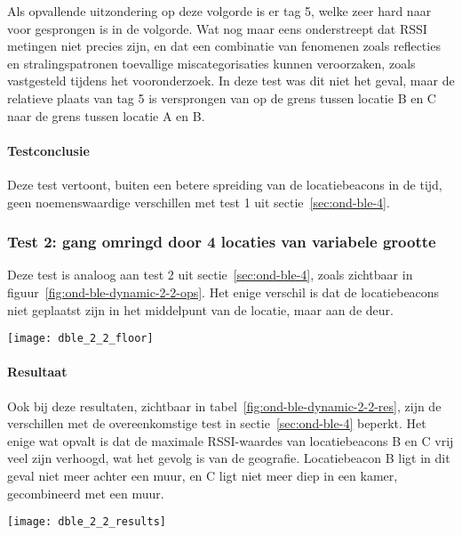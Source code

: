 Als opvallende uitzondering op deze volgorde is er tag 5, welke zeer hard naar voor gesprongen is in de volgorde. Wat nog maar eens onderstreept dat RSSI metingen niet precies zijn, en dat een combinatie van fenomenen zoals reflecties en stralingspatronen toevallige miscategorisaties kunnen veroorzaken, zoals vastgesteld tijdens het vooronderzoek. In deze test was dit niet het geval, maar de relatieve plaats van tag 5 is versprongen van op de grens tussen locatie B en C naar de grens tussen locatie A en B.

\paragraph{Testconclusie}
Deze test vertoont, buiten een betere spreiding van de locatiebeacons in de tijd, geen noemenswaardige verschillen met test 1 uit sectie~\ref{sec:ond-ble-4}.

\subsubsection{Test 2: gang omringd door 4 locaties van variabele grootte}
\label{sec:ond-ble-5-2}
\begin{minipage}{0.55\textwidth}
Deze test is analoog aan test 2 uit sectie~\ref{sec:ond-ble-4}, zoals zichtbaar in figuur~\ref{fig:ond-ble-dynamic-2-2-ops}. Het enige verschil is dat de locatiebeacons niet geplaatst zijn in het middelpunt van de locatie, maar aan de deur.
\end{minipage}
\hfill
\begin{minipage}{0.42\textwidth}
	\texttt{[image: dble\_2\_2\_floor]}
	\label{fig:ond-ble-dynamic-2-2-ops}
\end{minipage}

\paragraph{Resultaat}
\begin{minipage}{0.42\textwidth}
Ook bij deze resultaten, zichtbaar in tabel~\ref{fig:ond-ble-dynamic-2-2-res}, zijn de verschillen met de overeenkomstige test in sectie~\ref{sec:ond-ble-4} beperkt. Het enige wat opvalt is dat de maximale RSSI-waardes van locatiebeacons B en C vrij veel zijn verhoogd, wat het gevolg is van de geografie. Locatiebeacon B ligt in dit geval niet meer achter een muur, en C ligt niet meer diep in een kamer, gecombineerd met een muur. 
\end{minipage}
\hfill
\begin{minipage}{0.55\textwidth}
	\texttt{[image: dble\_2\_2\_results]}
	\label{fig:ond-ble-dynamic-2-2-res}
\end{minipage}

